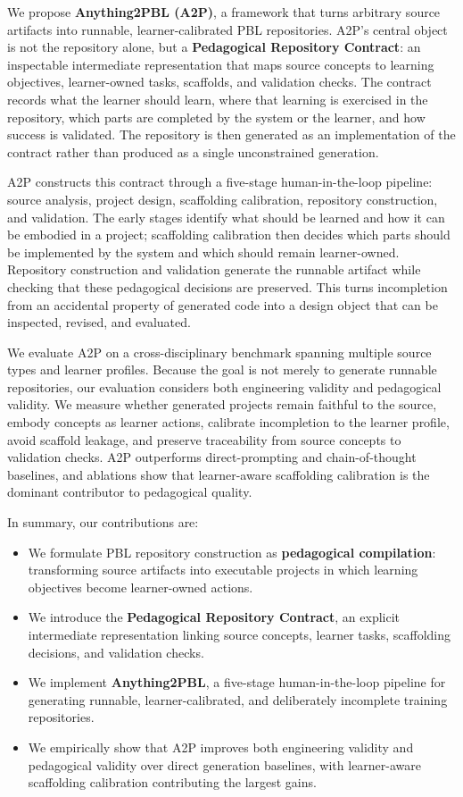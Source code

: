 \documentclass[11pt]{article}
\begin{document}
\noindent
We propose \textbf{Anything2PBL (A2P)}, a framework that turns arbitrary source artifacts into runnable, learner-calibrated PBL repositories.
A2P's central object is not the repository alone, but a \textbf{Pedagogical Repository Contract}: an inspectable intermediate representation that maps source concepts to learning objectives, learner-owned tasks, scaffolds, and validation checks.
The contract records what the learner should learn, where that learning is exercised in the repository, which parts are completed by the system or the learner, and how success is validated.
The repository is then generated as an implementation of the contract rather than produced as a single unconstrained generation.

\noindent
A2P constructs this contract through a five-stage human-in-the-loop pipeline: source analysis, project design, scaffolding calibration, repository construction, and validation.
The early stages identify what should be learned and how it can be embodied in a project; scaffolding calibration then decides which parts should be implemented by the system and which should remain learner-owned.
Repository construction and validation generate the runnable artifact while checking that these pedagogical decisions are preserved.
This turns incompletion from an accidental property of generated code into a design object that can be inspected, revised, and evaluated.

\noindent
We evaluate A2P on a cross-disciplinary benchmark spanning multiple source types and learner profiles.
Because the goal is not merely to generate runnable repositories, our evaluation considers both engineering validity and pedagogical validity.
We measure whether generated projects remain faithful to the source, embody concepts as learner actions, calibrate incompletion to the learner profile, avoid scaffold leakage, and preserve traceability from source concepts to validation checks.
A2P outperforms direct-prompting and chain-of-thought baselines, and ablations show that learner-aware scaffolding calibration is the dominant contributor to pedagogical quality.

\smallskip
\noindent In summary, our contributions are:
\begin{itemize}
    \item We formulate PBL repository construction as \textbf{pedagogical compilation}: transforming source artifacts into executable projects in which learning objectives become learner-owned actions.
    \item We introduce the \textbf{Pedagogical Repository Contract}, an explicit intermediate representation linking source concepts, learner tasks, scaffolding decisions, and validation checks.
    \item We implement \textbf{Anything2PBL}, a five-stage human-in-the-loop pipeline for generating runnable, learner-calibrated, and deliberately incomplete training repositories.
    \item We empirically show that A2P improves both engineering validity and pedagogical validity over direct generation baselines, with learner-aware scaffolding calibration contributing the largest gains.
\end{itemize}
\end{document}
